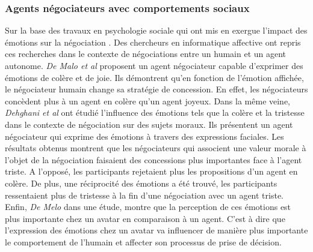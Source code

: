 	 \subsubsection{Agents négociateurs avec comportements sociaux}
	 
	 Sur la base des travaux en psychologie sociale qui ont mis en exergue l'impact des émotions sur la négociation \cite{van2006power}. Des chercheurs en informatique affective ont repris ces recherches dans le contexte de négociations entre un humain et un agent autonome. \emph{De Malo et al} \cite{de2011effect,de2015humans} proposent un agent négociateur capable d'exprimer des émotions de colère et de joie. Ils démontrent qu'en fonction de l'émotion affichée, le négociateur humain change sa stratégie de concession. En effet, les négociateurs concèdent plus à un agent en colère qu'un agent joyeux. Dans la même veine, \emph{Dehghani et al} \cite{dehghani2014interpersonal} ont étudié l'influence des émotions tels que la colère et la tristesse dans le contexte de négociation sur des sujets moraux. Ils présentent un agent négociateur qui exprime des émotions à travers des expressions faciales.
	 Les résultats obtenus montrent que les négociateurs qui associent une valeur morale à l'objet de la négociation faisaient des concessions plus importantes face à l'agent triste. A l'opposé, les participants rejetaient plus les propositions d'un agent en colère. De plus, une réciprocité des émotions a été trouvé, les participants ressentaient plus de tristesse à la fin d'une négociation avec un agent triste.  
	 Enfin, \emph{De Melo} \cite{de2015humans} dans une étude, montre que la perception de ces émotions est plus importante chez un avatar en comparaison à un agent. C'est à dire que l'expression des émotions chez un avatar va influencer de manière plus importante le comportement de l'humain et affecter son processus de prise de décision.  
	 
